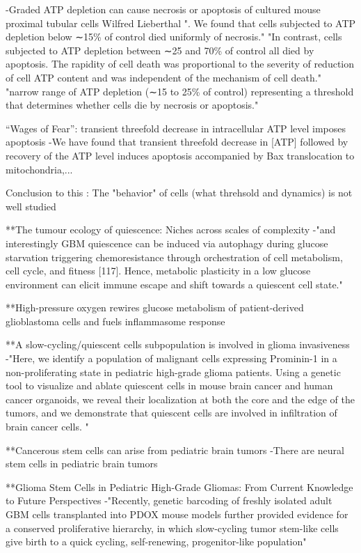 \documentclass[11pt,a4paper]{article}
\begin{document}
-Graded ATP depletion can cause necrosis or apoptosis of cultured mouse proximal tubular cells
Wilfred Lieberthal
". We found that cells subjected to ATP depletion below ∼15\% of control died uniformly of necrosis."
"In contrast, cells subjected to ATP depletion between ∼25 and 70\% of control all died by apoptosis. The rapidity of cell death was proportional to the severity of reduction of cell ATP content and was independent of the mechanism of cell death."
"narrow range of ATP depletion (∼15 to 25\% of control) representing a threshold that determines whether cells die by necrosis or apoptosis."

“Wages of Fear”: transient threefold decrease in intracellular ATP level imposes apoptosis
-We have found that transient threefold decrease in [ATP] followed by recovery of the ATP level induces apoptosis accompanied by Bax translocation to mitochondria,...

Conclusion to this : The "behavior" of cells (what threhsold and dynamics) is not well studied 

**The tumour ecology of quiescence: Niches across scales of complexity 
-"and interestingly GBM quiescence can be induced via autophagy during glucose starvation triggering chemoresistance through orchestration of cell metabolism, cell cycle, and fitness [117]. Hence, metabolic plasticity in a low glucose environment can elicit immune escape and shift towards a quiescent cell state."

**High-pressure oxygen rewires glucose metabolism of patient-derived glioblastoma cells and fuels inflammasome response

**A slow-cycling/quiescent cells subpopulation is involved in glioma invasiveness
-"Here, we identify a population of malignant cells expressing Prominin-1 in a non-proliferating state in pediatric high-grade glioma patients. Using a genetic tool to visualize and ablate quiescent cells in mouse brain cancer and human cancer organoids, we reveal their localization at both the core and the edge of the tumors, and we demonstrate that quiescent cells are involved in infiltration of brain cancer cells. "

**Cancerous stem cells can arise from pediatric brain tumors
-There are neural stem cells in pediatric brain tumors

**Glioma Stem Cells in Pediatric High-Grade Gliomas: From Current Knowledge to Future Perspectives
-"Recently, genetic barcoding of freshly isolated adult GBM cells transplanted into PDOX mouse models further provided evidence for a conserved proliferative hierarchy, in which slow-cycling tumor stem-like cells give birth to a quick cycling, self-renewing, progenitor-like population"
\end{document}
